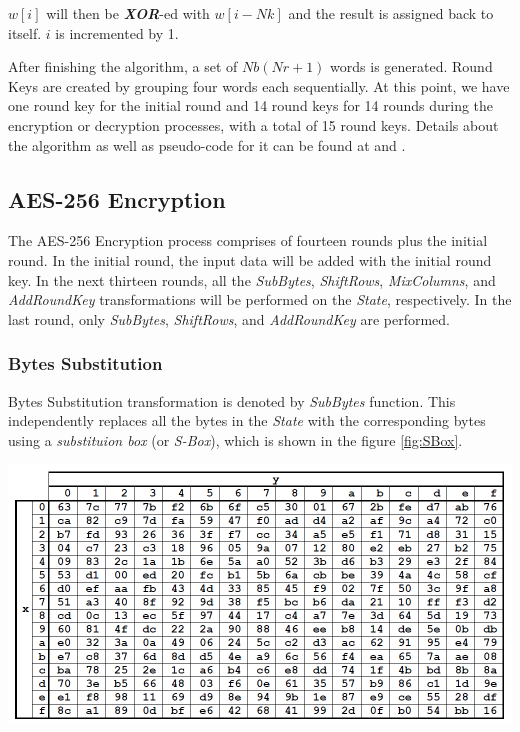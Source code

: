 \documentclass[a4paper, 10pt]{article}
\newenvironment{Figure}
    {\par\medskip\noindent\minipage{\linewidth}}
    {\endminipage\par\medskip}
\begin{document}
\begin{multicols}{2}
                $w[i]$ will then be \textbf{\textit{XOR}}-ed with $w[i-Nk]$ and the result is assigned back to itself. $i$ is incremented by 1.

                After finishing the algorithm, a set of $Nb(Nr+1)$ words is generated. Round Keys are created by grouping four words each sequentially. At this point, we have one round key for the initial round and 14 round keys for 14 rounds during the encryption or decryption processes, with a total of 15 round keys. Details about the algorithm as well as pseudo-code for it can be found at \cite{AES} and \cite{sam-key-expansion}.

            \subsection{AES-256 Encryption}

	The AES-256 Encryption process comprises of fourteen rounds plus the initial round. In the initial round, the input data will be added with the initial round key. In the next thirteen rounds, all the  \textit{SubBytes}, \textit{ShiftRows}, \textit{MixColumns}, and \textit{AddRoundKey} transformations will be performed on the \textit{State}, respectively. In the last round, only \textit{SubBytes}, \textit{ShiftRows}, and \textit{AddRoundKey} are performed.

            \subsubsection{Bytes Substitution}

            Bytes Substitution transformation is denoted by \textit{SubBytes} function. This independently replaces all the bytes in the \textit{State} with the corresponding bytes using a \textit{substituion box} (or \textit{S-Box}), which is shown in the figure \ref{fig:SBox}.

            \noindent
            \begin{Figure}
                \centering
                \includegraphics[width=\linewidth]{S-Box.png}
                \label{fig:SBox}
            \end{Figure}


\end{multicols}
\end{document}

